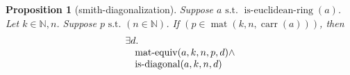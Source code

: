\documentclass[11pt]{article}
\theoremstyle{plain}
\newtheorem{proposition}{Proposition}
\begin{document}
\begin{proposition}[smith-diagonalization]
Suppose $a \text{ s.t. } \operatorname{is\text{-}euclidean\text{-}ring}(a)$. Let $k \in \mathbb{N}, n$. Suppose $p \text{ s.t. } (n \in \mathbb{N})$. If $(p \in \operatorname{mat}(k, n, \operatorname{carr}(a)))$, then 
\begin{equation*}
\begin{array}{@{}l@{}} \exists d. \\ \quad \operatorname{mat\text{-}equiv}(a, k, n, p, d) \wedge \\ \quad \operatorname{is\text{-}diagonal}(a, k, n, d) \end{array}
\end{equation*}

\end{proposition}
\end{document}
